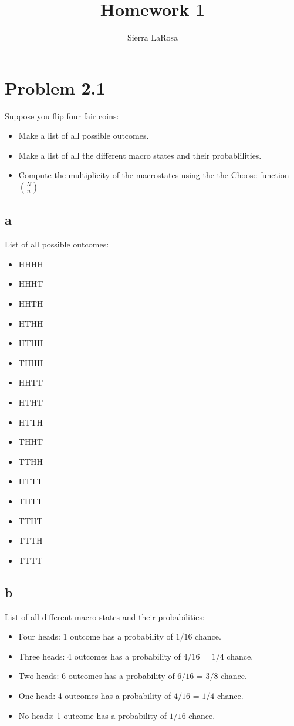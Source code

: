 \documentclass[a4paper,floatfix,nofootinbib]{article}
\title{Homework 1}
\author{Sierra LaRosa}
\begin{document}
\maketitle

\section*{Problem 2.1}
Suppose you flip four fair coins:

\begin{itemize}
    \item Make a list of all possible outcomes.
    \item Make a list of all the different macro states and their probablilities.
    \item Compute the multiplicity of the macrostates using the the Choose function $N \choose n$
\end{itemize}

\subsection*{a}
List of all possible outcomes:
\begin{itemize}
    \item HHHH
    \item HHHT
    \item HHTH
    \item HTHH
    \item HTHH
    \item THHH
    \item HHTT
    \item HTHT
    \item HTTH
    \item THHT
    \item TTHH
    \item HTTT
    \item THTT
    \item TTHT
    \item TTTH
    \item TTTT
\end{itemize}

\subsection*{b}
List of all different macro states and their probabilities:

\begin{itemize}
    \item Four heads: 1 outcome has a probability of $1/16$ chance.
    \item Three heads: 4 outcomes has a probability of $4/16$ = $1/4$ chance.
    \item Two heads: 6 outcomes has a probability of $6/16$ = $3/8$ chance.
    \item One head: 4 outcomes has a probability of $4/16$ = $1/4$ chance.
    \item No heads: 1 outcome has a probability of $1/16$ chance.
\end{itemize} 
\end{document}
